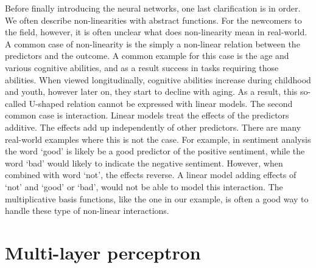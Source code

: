 Before finally introducing the neural networks,
one last clarification is in order.
We often describe non-linearities with abstract functions.
For the newcomers to the field, however,
it is often unclear what does non-linearity mean in real-world. 
A common case of non-linearity is the simply a non-linear 
relation between the predictors and the outcome.
A common example for this case is the age and various cognitive abilities,
and as a result success in tasks requiring those abilities.
When viewed longitudinally, cognitive abilities
increase during childhood and youth,
however later on, they start to decline with aging.
As a result, this so-called U-shaped relation cannot be
expressed with linear models.
The second common case is interaction.
Linear models treat the effects of the predictors additive.
The effects add up independently of other predictors.
There are many real-world examples where this is not the case.
For example, in sentiment analysis the word `good' is likely
be a good predictor of the positive sentiment,
while the word `bad' would likely to indicate the negative sentiment.
However, when combined with word `not',
the effects reverse.
A linear model adding effects of `not' and `good' or `bad',
would not be able to model this interaction.
The multiplicative basis functions, like the one in our example,
is often a good way to handle these type of non-linear interactions.

\section{Multi-layer perceptron}


